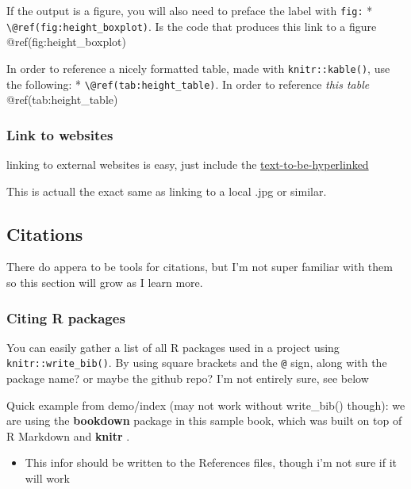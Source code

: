 \documentclass[
]{book}
\providecommand{\tightlist}{%
  \setlength{\itemsep}{0pt}\setlength{\parskip}{0pt}}
\begin{document}
If the output is a figure, you will also need to preface the label with \texttt{fig:}
* \texttt{\textbackslash{}@ref(fig:height\_boxplot)}. Is the code that produces this link to a figure @ref(fig:height\_boxplot)

In order to reference a nicely formatted table, made with \texttt{knitr::kable()}, use the following:
* \texttt{\textbackslash{}@ref(tab:height\_table)}. In order to reference \emph{this table} @ref(tab:height\_table)

\hypertarget{link-to-websites}{%
\subsubsection{Link to websites}\label{link-to-websites}}

linking to external websites is easy, just include the \href{https://ehrlichd.github.io/ipumsEDbook}{text-to-be-hyperlinked}

This is actuall the exact same as linking to a local .jpg or similar.

\hypertarget{citations}{%
\subsection{Citations}\label{citations}}

There do appera to be tools for citations, but I'm not super familiar with them so this section will grow as I learn more.

\hypertarget{citing-r-packages}{%
\subsubsection{Citing R packages}\label{citing-r-packages}}

You can easily gather a list of all R packages used in a project using \texttt{knitr::write\_bib()}.
By using square brackets and the \texttt{@} sign, along with the package name? or maybe the github repo? I'm not entirely sure, see below

Quick example from demo/index (may not work without write\_bib() though):
we are using the \textbf{bookdown} package \citep{R-bookdown} in this sample book,
which was built on top of R Markdown and \textbf{knitr} \citep{xie2015}.

\begin{itemize}
\tightlist
\item
  This infor should be written to the References files, though i'm not sure if it will work
\end{itemize}
\end{document}
